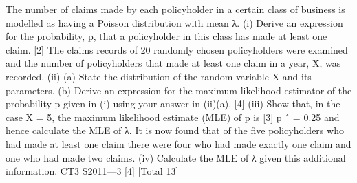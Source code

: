 The number of claims made by each policyholder in a certain class of business is
modelled as having a Poisson distribution with mean λ.
(i)
Derive an expression for the probability, p, that a policyholder in this class has
made at least one claim.
[2]
The claims records of 20 randomly chosen policyholders were examined and the
number of policyholders that made at least one claim in a year, X, was recorded.
(ii)
(a) State the distribution of the random variable X and its parameters.
(b) Derive an expression for the maximum likelihood estimator of the
probability p given in (i) using your answer in (ii)(a).
[4]
(iii)
Show that, in the case X = 5, the maximum likelihood estimate (MLE) of p is
[3]
p ˆ = 0.25 and hence calculate the MLE of λ.
It is now found that of the five policyholders who had made at least one claim there
were four who had made exactly one claim and one who had made two claims.
(iv)
Calculate the MLE of λ given this additional information.
CT3 S2011—3
[4]
[Total 13]




